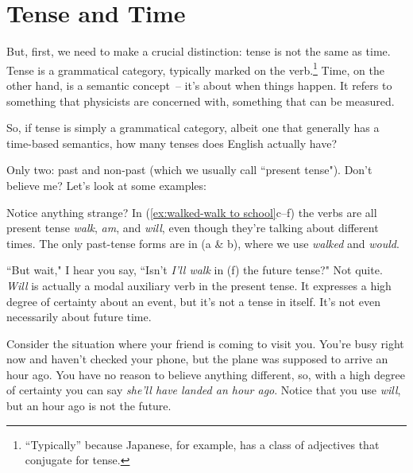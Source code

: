 \section{Tense and Time}\label{sec:tense-vs-time}

But, first, we need to make a crucial distinction: tense is not the same as time. Tense is a grammatical category, typically marked on the verb.\footnote{``Typically'' because Japanese, for example, has a class of adjectives that conjugate for tense.} Time, on the other hand, is a semantic concept~-- it's about when things happen. It refers to something that physicists are concerned with, something that can be measured.

So, if tense is simply a grammatical category, albeit one that generally has a time-based semantics, how many tenses does English actually have?

Only two: past and non-past (which we usually call ``present tense"). Don't believe me? Let's look at some examples:

Notice anything strange? In (\ref{ex:walked-walk to school}c--f) the verbs are all present tense \textit{walk}, \textit{am}, and \textit{will}, even though they're talking about different times. The only past-tense forms are in (a \& b), where we use \textit{walked} and \textit{would}.

``But wait," I hear you say, ``Isn't \textit{I'll walk} in (f) the future tense?" Not quite. \textit{Will} is actually a modal auxiliary verb in the present tense. It expresses a high degree of certainty about an event, but it's not a tense in itself. It's not even necessarily about future time.

Consider the situation where your friend is coming to visit you. You're busy right now and haven't checked your phone, but the plane was supposed to arrive an hour ago. You have no reason to believe anything different, so, with a high degree of certainty you can say \textit{she'll have landed an hour ago}. Notice that you use \textit{will}, but an hour ago is not the future.

